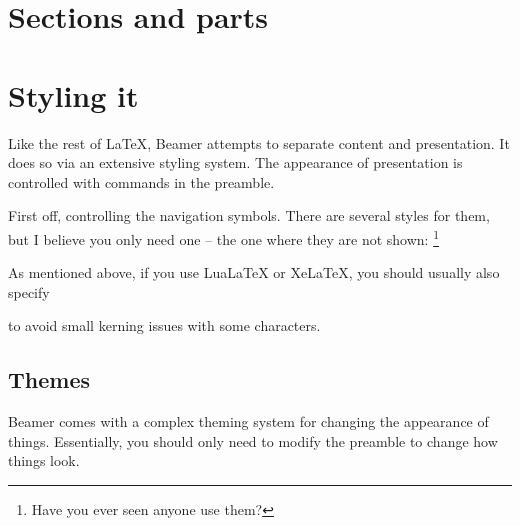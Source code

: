 


%
%
\section{Sections and parts}






%
%
\section{Styling it}\label{sec:beamer styles}

Like the rest of \LaTeX, Beamer attempts to separate content and presentation.
It does so via an extensive styling system.
The appearance of presentation is controlled with commands in the preamble.

First off, controlling the navigation symbols.
There are several styles for them, but I believe you only need one
-- the one where they are not shown:%
\footnote{Have you ever seen anyone use them?}
\begin{ExampleCode}
\beamertemplatenavigationsymbolsempty
\end{ExampleCode}

\begin{remark}
As mentioned above, if you use LuaLaTeX or XeLaTeX,
you should usually also specify
\begin{ExampleCode}
\end{ExampleCode}
to avoid small kerning issues with some characters.
\end{remark}




%
%
\subsection{Themes}

Beamer comes with a complex theming system for changing the appearance of things.
Essentially, you should only need to modify the preamble to change how things look.

